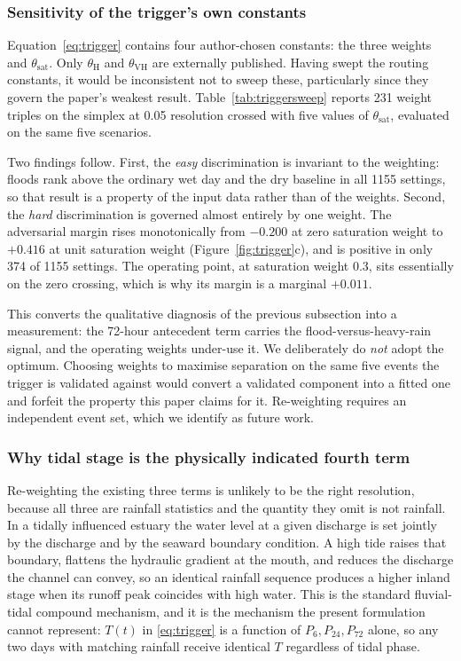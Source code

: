 \documentclass[11pt,a4paper]{article}
\newcommand{\Tt}{T(t)}
\begin{document}
\subsubsection*{Sensitivity of the trigger's own constants}
\label{sec:res-trigger-sweep}
Equation~\eqref{eq:trigger} contains four author-chosen constants: the three
weights and $\theta_{\mathrm{sat}}$. Only $\theta_{\mathrm{H}}$ and
$\theta_{\mathrm{VH}}$ are externally published. Having swept the routing
constants, it would be inconsistent not to sweep these, particularly since they
govern the paper's weakest result. Table~\ref{tab:triggersweep} reports 231
weight triples on the simplex at 0.05 resolution crossed with five values of
$\theta_{\mathrm{sat}}$, evaluated on the same five scenarios.

Two findings follow. First, the \emph{easy} discrimination is invariant to the
weighting: floods rank above the ordinary wet day and the dry baseline in all
\num{1155} settings, so that result is a property of the input data rather than
of the weights.
Second, the \emph{hard} discrimination is governed almost entirely by one weight.
The adversarial margin rises monotonically from $-0.200$ at zero saturation
weight to $+0.416$ at unit saturation weight
(Figure~\ref{fig:trigger}c), and is positive in only 374 of \num{1155} settings.
The operating point, at saturation weight 0.3, sits essentially on the zero
crossing, which is why its margin is a marginal $+0.011$.

This converts the qualitative diagnosis of the previous subsection into a
measurement: the 72-hour antecedent term carries the flood-versus-heavy-rain
signal, and the operating weights under-use it. We deliberately do \emph{not}
adopt the optimum. Choosing weights to maximise separation on the same five
events the trigger is validated against would convert a validated component into
a fitted one and forfeit the property this paper claims for it. Re-weighting
requires an independent event set, which we identify as future work.

\subsubsection*{Why tidal stage is the physically indicated fourth term}
Re-weighting the existing three terms is unlikely to be the right resolution,
because all three are rainfall statistics and the quantity they omit is not
rainfall. In a tidally influenced estuary the water level at a given discharge is
set jointly by the discharge and by the seaward boundary condition. A high tide
raises that boundary, flattens the hydraulic gradient at the mouth, and reduces
the discharge the channel can convey, so an identical rainfall sequence produces a
higher inland stage when its runoff peak coincides with high water. This is the
standard fluvial-tidal compound mechanism, and it is the mechanism the present
formulation cannot represent: $\Tt$ in \eqref{eq:trigger} is a function of
$P_6, P_{24}, P_{72}$ alone, so any two days with matching rainfall receive
identical $T$ regardless of tidal phase.
\end{document}
